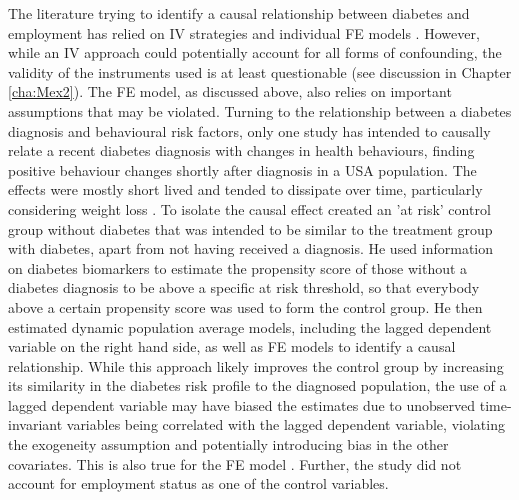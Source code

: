 The literature trying to identify a causal relationship between diabetes and employment has relied on \ac{IV} strategies \parencite{Brown2005,Latif2009,Seuring2015} and individual \ac{FE} models \parencite{Seuring2016}. However, while an \ac{IV} approach could potentially account for all forms of confounding, the validity of the instruments used is at least questionable (see discussion in Chapter \ref{cha:Mex2}). The \ac{FE} model, as discussed above, also relies on important assumptions that may be violated. Turning to the relationship between a diabetes diagnosis and behavioural risk factors, only one study has intended to causally relate a recent diabetes diagnosis with changes in health behaviours, finding positive behaviour changes shortly after diagnosis in a USA population. The effects were mostly short lived and tended to dissipate over time, particularly considering weight loss \parencite{Slade2012}. To isolate the causal effect \textcite{Slade2012} created an 'at risk' control group without diabetes that was intended to be similar to the treatment group with diabetes, apart from not having received a diagnosis. He used information on diabetes biomarkers to estimate the propensity score of those without a diabetes diagnosis to be above a specific at risk threshold, so that everybody above a certain propensity score was used to form the control group. He then estimated dynamic population average models, including the lagged dependent variable on the right hand side, as well as \ac{FE} models to identify a causal relationship. While this approach likely improves the control group by increasing its similarity in the diabetes risk profile to the diagnosed population, the use of a lagged dependent variable may have biased the estimates due to unobserved time-invariant variables being correlated with the lagged dependent variable, violating the exogeneity assumption and potentially introducing bias in the other covariates. This is also true for the \ac{FE} model \parencite{Nickell1981,Anderson1982}. Further, the study did not account for employment status as one of the control variables. 

